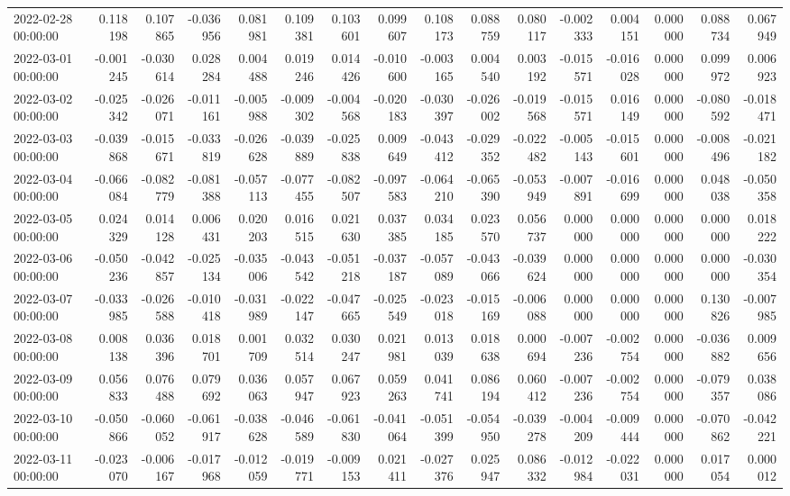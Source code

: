 \begin{tabular}{lrrrrrrrrrrrrrrr}
2022-02-28 00:00:00 & 0.118198 & 0.107865 & -0.036956 & 0.081981 & 0.109381 & 0.103601 & 0.099607 & 0.108173 & 0.088759 & 0.080117 & -0.002333 & 0.004151 & 0.000000 & 0.088734 & 0.067949 \\
2022-03-01 00:00:00 & -0.001245 & -0.030614 & 0.028284 & 0.004488 & 0.019246 & 0.014426 & -0.010600 & -0.003165 & 0.004540 & 0.003192 & -0.015571 & -0.016028 & 0.000000 & 0.099972 & 0.006923 \\
2022-03-02 00:00:00 & -0.025342 & -0.026071 & -0.011161 & -0.005988 & -0.009302 & -0.004568 & -0.020183 & -0.030397 & -0.026002 & -0.019568 & -0.015571 & 0.016149 & 0.000000 & -0.080592 & -0.018471 \\
2022-03-03 00:00:00 & -0.039868 & -0.015671 & -0.033819 & -0.026628 & -0.039889 & -0.025838 & 0.009649 & -0.043412 & -0.029352 & -0.022482 & -0.005143 & -0.015601 & 0.000000 & -0.008496 & -0.021182 \\
2022-03-04 00:00:00 & -0.066084 & -0.082779 & -0.081388 & -0.057113 & -0.077455 & -0.082507 & -0.097583 & -0.064210 & -0.065390 & -0.053949 & -0.007891 & -0.016699 & 0.000000 & 0.048038 & -0.050358 \\
2022-03-05 00:00:00 & 0.024329 & 0.014128 & 0.006431 & 0.020203 & 0.016515 & 0.021630 & 0.037385 & 0.034185 & 0.023570 & 0.056737 & 0.000000 & 0.000000 & 0.000000 & 0.000000 & 0.018222 \\
2022-03-06 00:00:00 & -0.050236 & -0.042857 & -0.025134 & -0.035006 & -0.043542 & -0.051218 & -0.037187 & -0.057089 & -0.043066 & -0.039624 & 0.000000 & 0.000000 & 0.000000 & 0.000000 & -0.030354 \\
2022-03-07 00:00:00 & -0.033985 & -0.026588 & -0.010418 & -0.031989 & -0.022147 & -0.047665 & -0.025549 & -0.023018 & -0.015169 & -0.006088 & 0.000000 & 0.000000 & 0.000000 & 0.130826 & -0.007985 \\
2022-03-08 00:00:00 & 0.008138 & 0.036396 & 0.018701 & 0.001709 & 0.032514 & 0.030247 & 0.021981 & 0.013039 & 0.018638 & 0.000694 & -0.007236 & -0.002754 & 0.000000 & -0.036882 & 0.009656 \\
2022-03-09 00:00:00 & 0.056833 & 0.076488 & 0.079692 & 0.036063 & 0.057947 & 0.067923 & 0.059263 & 0.041741 & 0.086194 & 0.060412 & -0.007236 & -0.002754 & 0.000000 & -0.079357 & 0.038086 \\
2022-03-10 00:00:00 & -0.050866 & -0.060052 & -0.061917 & -0.038628 & -0.046589 & -0.061830 & -0.041064 & -0.051399 & -0.054950 & -0.039278 & -0.004209 & -0.009444 & 0.000000 & -0.070862 & -0.042221 \\
2022-03-11 00:00:00 & -0.023070 & -0.006167 & -0.017968 & -0.012059 & -0.019771 & -0.009153 & 0.021411 & -0.027376 & 0.025947 & 0.086332 & -0.012984 & -0.022031 & 0.000000 & 0.017054 & 0.000012 \\

\end{tabular}
